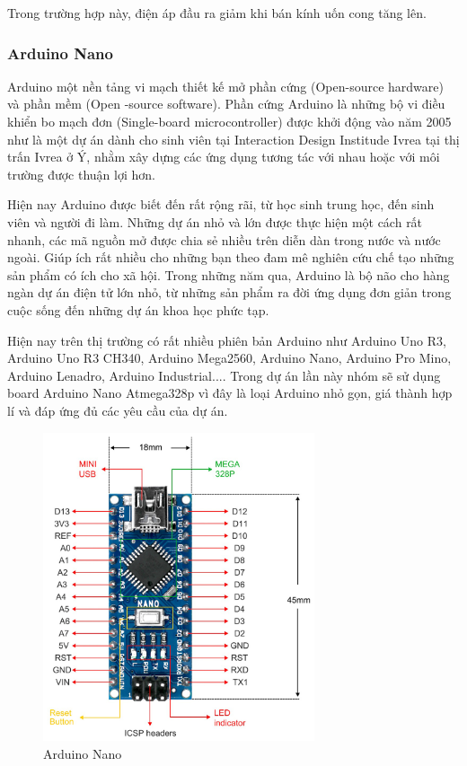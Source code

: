 \indent Trong trường hợp này, điện áp đầu ra giảm khi bán kính uốn cong tăng lên.


\subsubsection{Arduino Nano}


\indent Arduino một nền tảng vi mạch thiết kế mở phần cứng (Open-source hardware) và phần mềm (Open -source software). Phần cứng Arduino là những bộ vi điều khiển bo mạch đơn (Single-board microcontroller) được khởi động vào năm 2005 như là một dự án dành cho sinh viên tại Interaction Design Institude Ivrea tại thị trấn Ivrea ở Ý, nhằm xây dựng các ứng dụng tương tác với nhau hoặc với môi trường được thuận lợi hơn.

\indent Hiện nay Arduino được biết đến rất rộng rãi, từ học sinh trung học, đến sinh viên và người đi làm. Những dự án nhỏ và lớn được thực hiện một cách rất nhanh, các mã nguồn mở được chia sẻ nhiều trên diễn dàn trong nước và nước ngoài. Giúp ích rất nhiều cho những bạn theo đam mê nghiên cứu chế tạo những sản phẩm có ích cho xã hội. Trong những năm qua, Arduino là bộ não cho hàng ngàn dự án điện tử lớn nhỏ, từ những sản phẩm ra đời ứng dụng đơn giản trong cuộc sống đến những dự án khoa học phức tạp.

\indent Hiện nay trên thị trường có rất nhiều phiên bản Arduino như Arduino Uno R3, Arduino Uno R3 CH340, Arduino Mega2560, Arduino Nano, Arduino Pro Mino, Arduino Lenadro, Arduino Industrial.... Trong dự án lần này nhóm sẽ sử dụng board Arduino Nano Atmega328p vì đây là loại Arduino nhỏ gọn, giá thành hợp lí và đáp ứng đủ các yêu cầu của dự án.


\begin{figure}[H]
    \centering
    \includegraphics[width=8cm]{Images/Theoretical basis/arduino nano.jpg}
\caption{Arduino Nano}
\end{figure}

